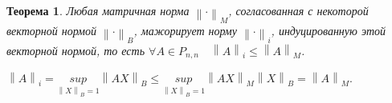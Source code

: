 \newtheorem*{th14_10_2}{Теорема}\begin{th14_10_2}Любая матричная норма $\left \|\cdot\right \|_M$, согласованная с некоторой векторной нормой $\left \|\cdot\right \|_B$, мажорирует норму $\left \|\cdot\right \|_i$, индуцированную этой векторной нормой, то есть $\forall A\in P_{n,n}\quad \left \|A\right \|_i\leqslant \left \|A\right \|_M$.
\end{th14_10_2}\begin{Proof}
	$\left \|A\right \|_i = \underset{\left \|X\right \|_B = 1}{sup} \left \|AX\right \|_B \leqslant \underset{\left \|X\right \|_B = 1}{sup} \left \|AX\right \|_M \left \|X\right \|_B = \left \|A\right \|_M$.
\end{Proof}





